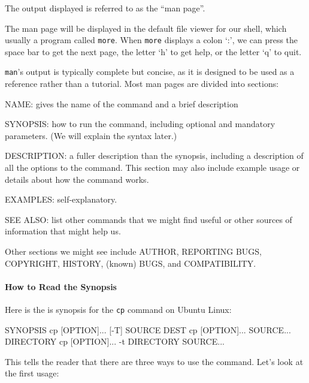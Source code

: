 \documentclass{book}
\begin{document}

The output displayed is referred to as the ``man page''.

The man page will be displayed in the default file viewer for our shell,
which usually a program called \texttt{more}. When \texttt{more}
displays a colon `:', we can press the space bar to get the next page,
the letter `h' to get help, or the letter `q' to quit.

\texttt{man}'s output is typically complete but concise, as it is
designed to be used as a reference rather than a tutorial. Most man
pages are divided into sections:

\begin{swcitemize}
\item
  NAME: gives the name of the command and a brief description
\item
  SYNOPSIS: how to run the command, including optional and mandatory
  parameters. (We will explain the syntax later.)
\item
  DESCRIPTION: a fuller description than the synopsis, including a
  description of all the options to the command. This section may also
  include example usage or details about how the command works.
\item
  EXAMPLES: self-explanatory.
\item
  SEE ALSO: list other commands that we might find useful or other
  sources of information that might help us.
\end{swcitemize}

Other sections we might see include AUTHOR, REPORTING BUGS, COPYRIGHT,
HISTORY, (known) BUGS, and COMPATIBILITY.

\mbox{}\paragraph{How to Read the Synopsis}

Here is the is synopsis for the \texttt{cp} command on Ubuntu Linux:

\begin{VerbOut}
SYNOPSIS
   cp [OPTION]... [-T] SOURCE DEST
   cp [OPTION]... SOURCE... DIRECTORY
   cp [OPTION]... -t DIRECTORY SOURCE...
\end{VerbOut}

This tells the reader that there are three ways to use the command.
Let's look at the first usage:
\end{document}
